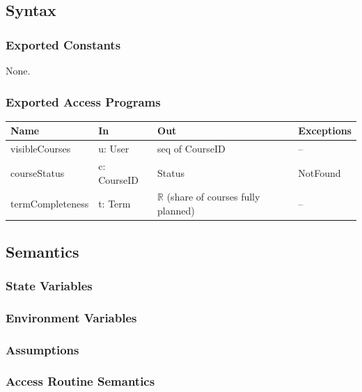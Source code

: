 \documentclass[12pt, titlepage]{article}
\begin{document}
\subsection{Syntax}

\subsubsection{Exported Constants}
None.

\subsubsection{Exported Access Programs}
\begin{center}\small
\begin{tabular}{>{\raggedright\arraybackslash}p{3.3cm} >{\raggedright\arraybackslash}p{4.1cm} >{\raggedright\arraybackslash}p{3.4cm} >{\raggedright\arraybackslash}p{4.0cm}}
\hline
\textbf{Name} & \textbf{In} & \textbf{Out} & \textbf{Exceptions} \\
\hline
visibleCourses & u: User & seq of CourseID & -- \\
courseStatus & c: CourseID & Status & NotFound \\
termCompleteness & t: Term & $\mathbb{R}$ (share of courses fully planned) & -- \\
\hline
\end{tabular}
\end{center}

\subsection{Semantics}

\subsubsection{State Variables}


\subsubsection{Environment Variables}


\subsubsection{Assumptions}

\subsubsection{Access Routine Semantics}
\end{document}
